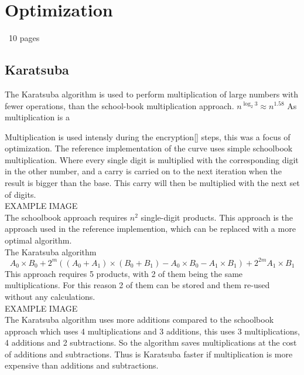 \section{Optimization}
~10 pages

\subsection{Karatsuba}
The Karatsuba algorithm is used to perform multiplication of large numbers with fewer operations, than the school-book multiplication approach.
$n^{\log_{2}3} \approx n^{1.58}$
As multiplication is a 

Multiplication is used intensly during the encryption[] steps, this was a focus of optimization. The reference implementation of the curve uses simple schoolbook multiplication.
Where every single digit is multiplied with the corresponding digit in the other number, and a carry is carried on to the next iteration when the result is bigger than the base. This carry will then be multiplied with the next set of digits.\\
EXAMPLE IMAGE\\
The schoolbook approach requires $n^{2}$ single-digit products. 
This approach is the approach used in the reference implemention, which can be replaced with a more optimal algorithm.
\\

The Karatsuba algorithm 
\[A_0 \times B_0 + 2^{m}((A_0 + A_1) \times (B_0 + B_1) - A_0 \times B_0 - A_1 \times B_1) + 2^{2m} A_1 \times B_1\]
This approach requires 5 products, with 2 of them being the same multiplications. For this reason 2 of them can be stored and them re-used without any calculations.
\\EXAMPLE IMAGE\\
The Karatsuba algorithm uses more additions compared to the schoolbook approach which uses 4 multiplications and 3 additions, this uses 3 multiplications, 4 additions and 2 subtractions. So the algorithm saves multiplications at the cost of additions and subtractions. Thus is Karatsuba faster if multiplication is more expensive than additions and subtractions. 

